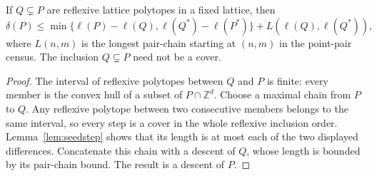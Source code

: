 \begin{lemma}\label{lem:seedinterval}
If $Q\subsetneq P$ are reflexive lattice polytopes in a fixed lattice, then
\[
\delta(P)\le \min\{\ell(P)-\ell(Q),\ell(Q^*)-\ell(P^*)\}
                   +L(\ell(Q),\ell(Q^*)),
\]
where $L(n,m)$ is the longest pair-chain starting at $(n,m)$ in the
point-pair census. The inclusion $Q\subsetneq P$ need not be a cover.
\end{lemma}
\begin{proof}
The interval of reflexive polytopes between $Q$ and $P$ is finite:
every member is the convex hull of a subset of $P\cap\mathbb Z^d$.
Choose a maximal chain from $P$ to $Q$. Any reflexive polytope between
two consecutive members belongs to the same interval, so every step
is a cover in the whole reflexive inclusion order. Lemma~\ref{lem:seedstep}
shows that its length is at most each of the two displayed differences.
Concatenate this chain with a descent of $Q$, whose length is bounded
by its pair-chain bound. The result is a descent of $P$.
\end{proof}

